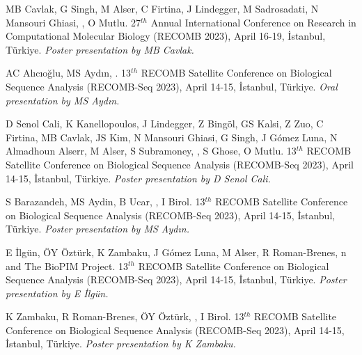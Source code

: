 \vspace{-.2cm}{\bf TargetCall: eliminating the wasted computation in basecalling via pre-basecalling filtering.} MB Cavlak, G Singh, M Alser, C Firtina, J Lindegger, M Sadrosadati, N Mansouri Ghiasi,  \calkan{}, O Mutlu. 27$^{th}$ Annual International Conference on Research in Computational Molecular Biology (RECOMB 2023), April 16-19, İstanbul, Türkiye. {\it Poster presentation by MB Cavlak.}


\vspace{-.2cm}{\bf Pairwise sequence alignment with block and character edit operations.} AC Alıcıoğlu, MS Aydın, \calkan{}. 13$^{th}$ RECOMB Satellite Conference on Biological Sequence Analysis (RECOMB-Seq 2023), April 14-15, İstanbul, Türkiye. {\it Oral presentation by MS Aydın.}

\vspace{-.2cm}{\bf SeGraM: a universal hardware accelerator for genomic sequence-to-graph and sequence-to-sequence mapping.} D Senol Cali, K Kanellopoulos, J Lindegger, Z Bingöl, GS Kalsi, Z Zuo, C Firtina, MB Cavlak, JS Kim, N Mansouri Ghiasi, G Singh, J Gómez Luna, N Almadhoun Alserr, M Alser, S Subramoney, \calkan{}, S Ghose, O Mutlu. 13$^{th}$ RECOMB Satellite Conference on Biological Sequence Analysis (RECOMB-Seq 2023), April 14-15, İstanbul, Türkiye. {\it Poster presentation by D Senol Cali.}

\vspace{-.2cm}{\bf Using minimizer interarrival distances for read-until human read detection from blood samples sequenced by Oxford Nanopore.} S Barazandeh, MS Aydin, B Ucar, \calkan{}, I Birol. 13$^{th}$ RECOMB Satellite Conference on Biological Sequence Analysis (RECOMB-Seq 2023), April 14-15, İstanbul, Türkiye. {\it Poster presentation by MS Aydın.}

\clearpage

\vspace{-.2cm}{\bf Characterization of alignment and search algorithms for short read, long read, and graph mappers.} E İlgün, ÖY Öztürk, K Zambaku, J Gómez Luna, M Alser, R Roman-Brenes, \calkan{}n and The BioPIM Project. 13$^{th}$ RECOMB Satellite Conference on Biological Sequence Analysis (RECOMB-Seq 2023), April 14-15, İstanbul, Türkiye. {\it Poster presentation by E İlgün.}

 K Zambaku, R Roman-Brenes, ÖY Öztürk, \calkan{}, I Birol. 13$^{th}$ RECOMB Satellite Conference on Biological Sequence Analysis (RECOMB-Seq 2023), April 14-15, İstanbul, Türkiye. {\it Poster presentation by K Zambaku.}



